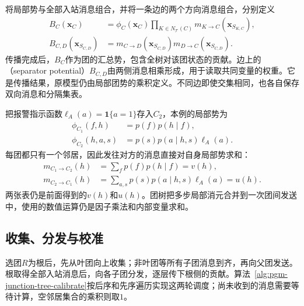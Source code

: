 将局部势与全部入站消息组合，并将一条边的两个方向消息组合，分别定义
\begin{equation}
  \begin{aligned}
    B_C(\bm{x}_C)
      &=\phi_C(\bm{x}_C)
        \prod_{K\in N_{\mathcal{T}}(C)}
          m_{K\to C}(\bm{x}_{S_{K,C}}),\\
    B_{C,D}(\bm{x}_{S_{C,D}})
      &=m_{C\to D}(\bm{x}_{S_{C,D}})
        m_{D\to C}(\bm{x}_{S_{C,D}}).
  \end{aligned}
  \label{eq:pgm-junction-tree-clique-separator-beliefs}
\end{equation}
传播完成后，$B_C$作为团的汇总势，包含全树对该团状态的贡献。边上的（separator potential）$B_{C,D}$由两侧消息相乘形成，用于读取共同变量的权重。它是传播结果，原模型仍由局部团势的乘积定义。不同边即使交集相同，也各自保存双向消息和分隔集表。

把报警指示函数$\ell_A(a)=\mathbf{1}\{a=1\}$存入$C_2$，本例的局部势为
\[
  \begin{aligned}
    \phi_{C_1}(f,h)&=p(f)p(h\mid f),\\
    \phi_{C_2}(h,a,s)&=p(s)p(a\mid h,s)\ell_A(a).
  \end{aligned}
\]
每团都只有一个邻居，因此发往对方的消息直接对自身局部势求和：
\begin{equation}
  \begin{aligned}
    m_{C_1\to C_2}(h)&=\sum_f p(f)p(h\mid f)=v(h),\\
    m_{C_2\to C_1}(h)&=\sum_{a,s}p(s)p(a\mid h,s)\ell_A(a)=u(h).
  \end{aligned}
  \label{eq:pgm-junction-tree-device-clique-messages}
\end{equation}
两张表仍是前面得到的$v(h)$和$u(h)$。团树把多步局部消元合并到一次团间发送中，使用的数值运算仍是因子乘法和内部变量求和。

\subsection{收集、分发与校准}
\label{sec:pgm-junction-tree-calibration}

选团$R$为根后，先从叶团向上收集；非叶团等所有子团消息到齐，再向父团发送。根取得全部入站消息后，向各子团分发，逐层传下根侧的贡献。算法~\ref{alg:pgm-junction-tree-calibrate}按后序和先序遍历实现这两轮调度；尚未收到的消息需要等待计算，空邻居集合的乘积则取$1$。

